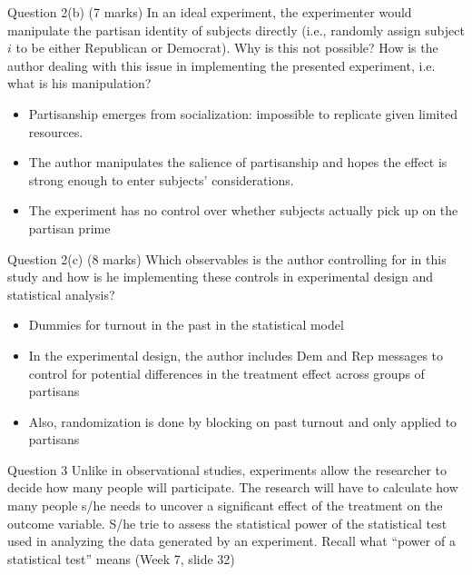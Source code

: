 \documentclass[xcolor=table,dvipsnames]{beamer}
\begin{document}
\begin{frame}{Question 2(b)}
(7 marks) In an ideal experiment, the experimenter would manipulate the partisan identity of subjects directly (i.e., randomly assign subject $i$ to be either Republican or Democrat). 
Why is this not possible? How is the author dealing with this issue in implementing the presented experiment, i.e. what is his manipulation? \pause

\begin{itemize}
\item Partisanship emerges from socialization: impossible to replicate given limited resources. \pause 
\item The author manipulates the salience of partisanship and hopes the effect is strong enough to enter subjects' considerations. \pause 
\item The experiment has no control over whether subjects actually pick up on the partisan prime
\end{itemize}
\end{frame}

\begin{frame}{Question 2(c)}
(8 marks) Which observables is the author controlling for in this study and how is he implementing these controls in experimental design and statistical analysis? \pause

\begin{itemize}
\item Dummies for turnout in the past in the statistical model \pause
\item In the experimental design, the author includes Dem and Rep messages to control for potential differences in the treatment effect across groups of partisans \pause
\item Also, randomization is done by blocking on past turnout and only applied to partisans
\end{itemize}
\end{frame}

\begin{frame}{Question 3}
Unlike in observational studies, experiments allow the researcher to decide how many people will participate. 
The research will have to calculate how many people s/he needs to uncover a significant effect of the treatment on the outcome variable. 
S/he trie to assess the statistical power of the statistical test used in analyzing the data generated by an experiment. 
Recall what ``power of a statistical test'' means (Week 7, slide 32)
\end{frame}
\end{document}
